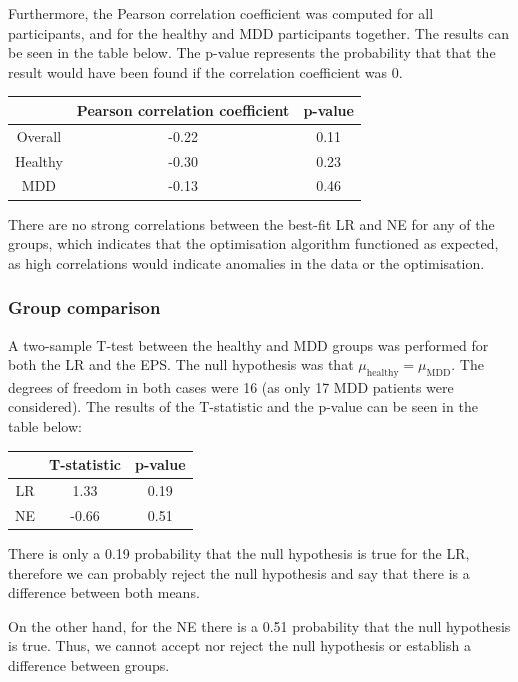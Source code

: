 \documentclass[12pt]{article}
\begin{document}
Furthermore, the Pearson correlation coefficient was computed for all participants, and for the healthy and MDD participants together. The results can be seen in the table below. The p-value represents the probability that that the result would have been found if the correlation coefficient was 0.

\begin{center}
 \begin{tabular}{|c || c | c |} 
 \hline
  & Pearson correlation coefficient & p-value  \\ [0.5ex] 
 \hline\hline
 Overall & -0.22 & 0.11 \\ 
 \hline
 Healthy & -0.30 & 0.23 \\
 \hline
 MDD & -0.13 & 0.46 \\ [1ex] 
 \hline
\end{tabular}
\end{center}

There are no strong correlations between the best-fit LR and NE for any of the groups, which indicates that the optimisation algorithm functioned as expected, as high correlations would indicate anomalies in the data or the optimisation. 

\subsubsection{Group comparison}

A two-sample T-test between the healthy and MDD groups was performed for both the LR and the EPS. The null hypothesis was that $\mu_{\mathrm{healthy}} = \mu_{\mathrm{MDD}}$. The degrees of freedom in both cases were 16 (as only 17 MDD patients were considered). The results of the T-statistic and the p-value can be seen in the table below:

\begin{center}
 \begin{tabular}{|c || c | c |} 
 \hline
  & T-statistic & p-value  \\ [0.5ex] 
 \hline\hline
 LR & 1.33 & 0.19 \\
 \hline
 NE & -0.66 & 0.51 \\ [1ex] 
 \hline
\end{tabular}
\end{center}

There is only a 0.19 probability that the null hypothesis is true for the LR, therefore we can probably reject the null hypothesis and say that there is a difference between both means.

On the other hand, for the NE there is a 0.51 probability that the null hypothesis is true. Thus, we cannot accept nor reject the null hypothesis or establish a difference between groups.








\end{document}
